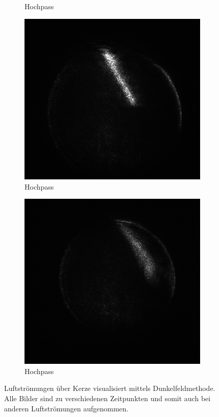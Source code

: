 \documentclass[
	a4paper,
	12pt,
	pagesize,
	ngerman
]{scrartcl}
\begin{document}
\begin{figure}[H]
\begin{subfigure}[b]{0.475\textwidth}
            \caption%
            {Hochpass}
            \label{fig_air_3}
        \end{subfigure}
				\hfill
				\begin{subfigure}[b]{0.475\textwidth}
            \centering
            \includegraphics[width=\textwidth]{raw/4/4_k_spa_crop}
            \caption[]%
            {Hochpass}
            \label{fig_air_2}
        \end{subfigure}
				\begin{subfigure}[b]{0.475\textwidth}
            \centering
						\includegraphics[width=\textwidth]{raw/4/4_k_2}
            \caption%
            {Hochpass}
						\label{fig_air}
        \end{subfigure}
		  \caption{
				Luftströmungen über Kerze visualisiert mittels Dunkelfeldmethode.
				Alle Bilder sind zu verschiedenen Zeitpunkten und somit auch bei anderen Luftströmungen aufgenommen.
			}
        \label{fig_4_air_mix}
    \end{figure}
\end{document}
